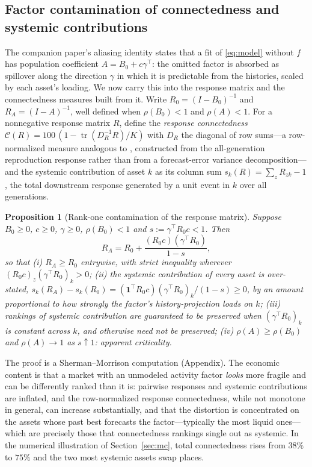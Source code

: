 \documentclass[12pt]{article}
\theoremstyle{plain}\newtheorem{theorem}{Theorem}[section]\newtheorem{proposition}[theorem]{Proposition}\newtheorem{lemma}[theorem]{Lemma}\newtheorem{corollary}[theorem]{Corollary}
\theoremstyle{definition}\newtheorem{definition}[theorem]{Definition}\newtheorem{assumption}[theorem]{Assumption}\newtheorem{remark}[theorem]{Remark}
\begin{document}
\subsection{Factor contamination of connectedness and systemic contributions}
The companion paper's aliasing identity states that a fit of \eqref{eq:model} without $f$ has population coefficient $A=B_0+c\gamma^{\top}$: the omitted factor is absorbed as spillover along the direction $\gamma$ in which it is predictable from the histories, scaled by each asset's loading. We now carry this into the response matrix and the connectedness measures built from it. Write $R_0=(I-B_0)^{-1}$ and $R_A=(I-A)^{-1}$, well defined when $\rho(B_0)<1$ and $\rho(A)<1$. For a nonnegative response matrix $R$, define the \emph{response connectedness} $\mathcal C(R)=100\,(1-\operatorname{tr}(D_R^{-1}R)/K)$ with $D_R$ the diagonal of row sums---a row-normalized measure analogous to \citet{diebold2014}, constructed from the all-generation reproduction response rather than from a forecast-error variance decomposition---and the systemic contribution of asset $k$ as its column sum $s_k(R)=\sum_zR_{zk}-1$, the total downstream response generated by a unit event in $k$ over all generations.
\begin{proposition}[Rank-one contamination of the response matrix]\label{prop:connect}
Suppose $B_0\ge0$, $c\ge0$, $\gamma\ge0$, $\rho(B_0)<1$ and $s:=\gamma^{\top}R_0c<1$. Then
\begin{equation}\label{eq:sm}
R_A=R_0+\frac{(R_0c)(\gamma^{\top}R_0)}{1-s},
\end{equation}
so that (i) $R_A\ge R_0$ entrywise, with strict inequality wherever $(R_0c)_z(\gamma^{\top}R_0)_k>0$; (ii) the systemic contribution of every asset is over-stated, $s_k(R_A)-s_k(R_0)=(\mathbf 1^{\top}R_0c)(\gamma^{\top}R_0)_k/(1-s)\ge0$, by an amount proportional to how strongly the factor's history-projection loads on $k$; (iii) rankings of systemic contribution are guaranteed to be preserved when $(\gamma^{\top}R_0)_k$ is constant across $k$, and otherwise need not be preserved; (iv) $\rho(A)\ge\rho(B_0)$ and $\rho(A)\to1$ as $s\uparrow1$: apparent criticality.
\end{proposition}
The proof is a Sherman--Morrison computation (Appendix). The economic content is that a market with an unmodeled activity factor \emph{looks} more fragile and can be differently ranked than it is: pairwise responses and systemic contributions are inflated, and the row-normalized response connectedness, while not monotone in general, can increase substantially, and that the distortion is concentrated on the assets whose past best forecasts the factor---typically the most liquid ones---which are precisely those that connectedness rankings single out as systemic. In the numerical illustration of Section~\ref{sec:mc}, total connectedness rises from $38\%$ to $75\%$ and the two most systemic assets swap places.
\end{document}
